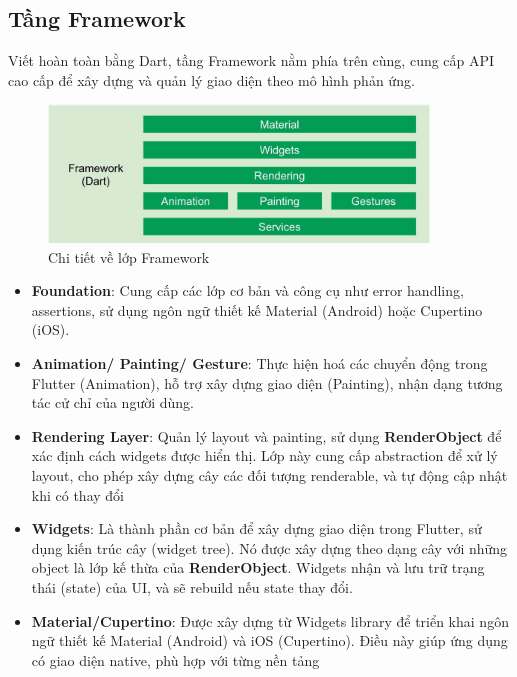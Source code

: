 \documentclass[../DoAn.tex]{subfiles}
\numberwithin{figure}{chapter}
\begin{document}
\subsection{Tầng Framework}
 Viết hoàn toàn bằng Dart, tầng Framework nằm phía trên cùng, cung cấp API cao cấp để xây dựng và quản lý giao diện theo mô hình phản ứng.
 \begin{figure}[H]
    \centering
    \includegraphics[width=0.9\textwidth]{Hinhve/Chuong5/tang_framework.jpg}
    \caption{Chi tiết về lớp Framework}
    \label{fig:frameworklayer}
\end{figure}
\begin{itemize}
    \item \textbf{Foundation}: Cung cấp các lớp cơ bản và công cụ như error handling, assertions, sử dụng ngôn ngữ thiết kế Material (Android) hoặc Cupertino (iOS).
    \item \textbf{Animation/ Painting/ Gesture}: Thực hiện hoá các chuyển động trong Flutter (Animation), hỗ trợ xây dựng giao diện (Painting), nhận dạng tương tác cử chỉ của người dùng.
    \item \textbf{Rendering Layer}: Quản lý layout và painting, sử dụng \textbf{RenderObject} để xác định cách widgets được hiển thị. Lớp này cung cấp abstraction để xử lý layout, cho phép xây dựng cây các đối tượng renderable, và tự động cập nhật khi có thay đổi
    \item \textbf{Widgets}: Là thành phần cơ bản để xây dựng giao diện trong Flutter, sử dụng kiến trúc cây (widget tree). Nó được xây dựng theo dạng cây với những object là lớp kế thừa của \textbf{RenderObject}. Widgets nhận và lưu trữ trạng thái (state) của UI, và sẽ rebuild nếu state thay đổi.
    \item \textbf{Material/Cupertino}: Được xây dựng từ Widgets library để triển khai ngôn ngữ thiết kế Material (Android) và iOS (Cupertino). Điều này giúp ứng dụng có giao diện native, phù hợp với từng nền tảng
\end{itemize}
\end{document}
